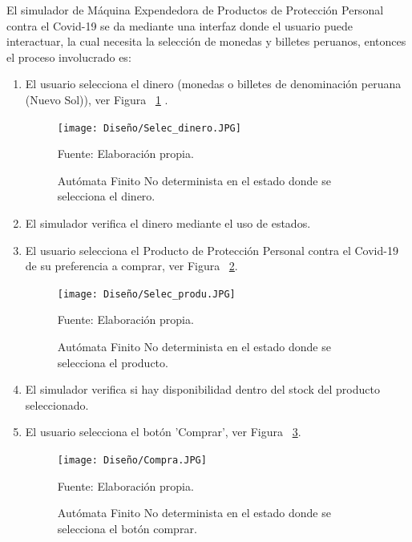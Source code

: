 \documentclass[10pt,conference]{IEEEtran}
\begin{document}
El simulador de Máquina Expendedora de Productos de Protección Personal contra el Covid-19 se da mediante una interfaz donde el usuario puede interactuar, la cual necesita la selección de monedas y billetes peruanos, entonces el proceso involucrado es:
\begin{enumerate}
    \item El usuario selecciona el dinero (monedas o billetes de denominación peruana (Nuevo Sol)), ver Figura ~\ref{sel_din} .
    
    \begin{figure}[H]
    \begin{center}
    \texttt{[image: Diseño/Selec\_dinero.JPG]}
    \centering
    \caption{\small Autómata Finito No determinista en el estado donde se selecciona el dinero.}
    \label{sel_din} 
    \end{center}
    \vspace{1.5 mm}
    {\small Fuente: Elaboración propia.}
    \end{figure}

    \item El simulador verifica el dinero mediante el uso de estados.
    \item El usuario selecciona el Producto de Protección Personal contra el Covid-19 de su preferencia a comprar, ver Figura ~\ref{sel_prod}.
    
    \begin{figure}[H]
    \begin{center}
    \texttt{[image: Diseño/Selec\_produ.JPG]}
    \centering
    \caption{Autómata Finito No determinista en el estado donde se selecciona el producto.}
    \label{sel_prod} 
    \end{center}
    \vspace{1.5 mm}
    {\small Fuente: Elaboración propia.}
    \end{figure}

    \item El simulador verifica si hay disponibilidad dentro del stock del producto seleccionado.
    \item El usuario selecciona el botón 'Comprar', ver Figura ~\ref{comrpa}.
    
    \begin{figure}[H]
    \begin{center}
    \texttt{[image: Diseño/Compra.JPG]}
    \centering
    \caption{Autómata Finito No determinista en el estado donde se selecciona el botón comprar.}
    \label{comrpa} 
    \end{center}
    \vspace{1.5 mm}
    {\small Fuente: Elaboración propia.}
    \end{figure}
    

\end{enumerate}
\end{document}
